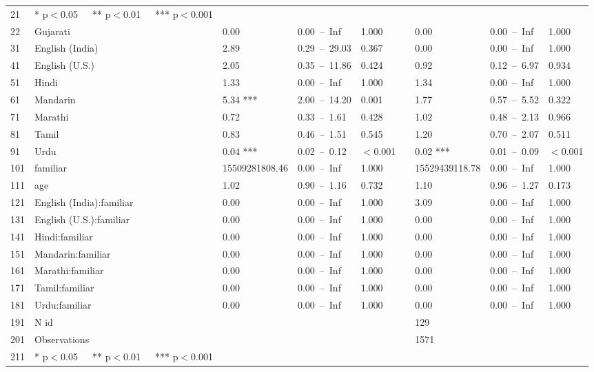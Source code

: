 \begin{table}[ht]
\begin{tabular}{}
  21 & * p$<$0.05   ** p$<$0.01   *** p$<$0.001 &  &  &  &  &  &  &  \\ 
  22 & Gujarati & 0.00 & 0.00 – Inf & 1.000 &  & 0.00 & 0.00 – Inf & 1.000 \\ 
  31 & English (India) & 2.89 & 0.29 – 29.03 & 0.367 &  & 0.00 & 0.00 – Inf & 1.000 \\ 
  41 & English (U.S.) & 2.05 & 0.35 – 11.86 & 0.424 &  & 0.92 & 0.12 – 6.97 & 0.934 \\ 
  51 & Hindi & 1.33 & 0.00 – Inf & 1.000 &  & 1.34 & 0.00 – Inf & 1.000 \\ 
  61 & Mandarin & 5.34 *** & 2.00 – 14.20 & 0.001 &  & 1.77 & 0.57 – 5.52 & 0.322 \\ 
  71 & Marathi & 0.72 & 0.33 – 1.61 & 0.428 &  & 1.02 & 0.48 – 2.13 & 0.966 \\ 
  81 & Tamil & 0.83 & 0.46 – 1.51 & 0.545 &  & 1.20 & 0.70 – 2.07 & 0.511 \\ 
  91 & Urdu & 0.04 *** & 0.02 – 0.12 & $<$0.001 &  & 0.02 *** & 0.01 – 0.09 & $<$0.001 \\ 
  101 & familiar & 15509281808.46 & 0.00 – Inf & 1.000 &  & 15529439118.78 & 0.00 – Inf & 1.000 \\ 
  111 & age & 1.02 & 0.90 – 1.16 & 0.732 &  & 1.10 & 0.96 – 1.27 & 0.173 \\ 
  121 & English (India):familiar & 0.00 & 0.00 – Inf & 1.000 &  & 3.09 & 0.00 – Inf & 1.000 \\ 
  131 & English (U.S.):familiar & 0.00 & 0.00 – Inf & 1.000 &  & 0.00 & 0.00 – Inf & 1.000 \\ 
  141 & Hindi:familiar & 0.00 & 0.00 – Inf & 1.000 &  & 0.00 & 0.00 – Inf & 1.000 \\ 
  151 & Mandarin:familiar & 0.00 & 0.00 – Inf & 1.000 &  & 0.00 & 0.00 – Inf & 1.000 \\ 
  161 & Marathi:familiar & 0.00 & 0.00 – Inf & 1.000 &  & 0.00 & 0.00 – Inf & 1.000 \\ 
  171 & Tamil:familiar & 0.00 & 0.00 – Inf & 1.000 &  & 0.00 & 0.00 – Inf & 1.000 \\ 
  181 & Urdu:familiar & 0.00 & 0.00 – Inf & 1.000 &  & 0.00 & 0.00 – Inf & 1.000 \\ 
  191 & N id &  &  &  &  & 129 &  &  \\ 
  201 & Observations &  &  &  &  & 1571 &  &  \\ 
  211 & * p$<$0.05   ** p$<$0.01   *** p$<$0.001 &  &  &  &  &  &  &  \\ 
   \hline
\end{tabular}
\end{table}
